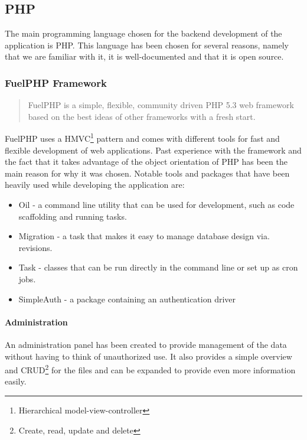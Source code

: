 \subsection{PHP}
\label{sec:php}
The main programming language chosen for the backend development of the application is PHP. This language has been chosen for several reasons, namely that we are familiar with it, it is well-documented and that it is open source.

\subsubsection{FuelPHP Framework}
\label{sec:fuelphp_framework}
\begin{quote}
FuelPHP is a simple, flexible, community driven PHP 5.3 web framework based on the best ideas of other frameworks with a fresh start\cite{FuelPHP}.
\end{quote}

FuelPHP uses a HMVC\footnote{Hierarchical model-view-controller} pattern and comes with different tools for fast and flexible development of web applications. Past experience with the framework and the fact that it takes advantage of the object orientation of PHP has been the main reason for why it was chosen. Notable tools and packages that have been heavily used while developing the application are:

\begin{itemize}
\item Oil - a command line utility that can be used for development, such as code scaffolding and running tasks. 
\item Migration - a task that makes it easy to manage database design via. revisions.
\item Task - classes that can be run directly in the command line or set up as cron jobs.
\item SimpleAuth - a package containing an authentication driver
\end{itemize}

\paragraph{Administration}
\label{sec:administration}
An administration panel has been created to provide management of the data without having to think of unauthorized use. It also provides a simple overview and CRUD\footnote{Create, read, update and delete} for the \textsf{files} and can be expanded to provide even more information easily.

